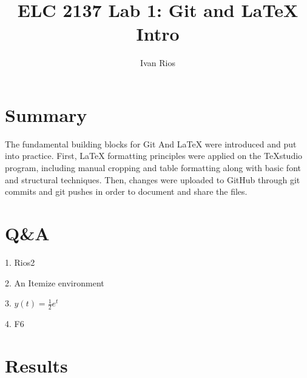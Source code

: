 \documentclass[11pt]{article}
\begin{document}
\title{ELC 2137 Lab 1: Git and LaTeX Intro}
\author{Ivan Rios}

\maketitle


\section*{Summary}

The fundamental building blocks for Git And LaTeX were introduced and put into practice. First, LaTeX formatting principles were applied on the TeXstudio program, including manual cropping and table formatting along with basic font and structural techniques. Then, changes were uploaded to GitHub through git commits and git pushes in order to document and share the files.


\section*{Q\&A}

1. Rios2

2. An Itemize environment

3.  $y(t) =\frac{1}{2}e^t$

4. F6

\section*{Results}
\end{document}
